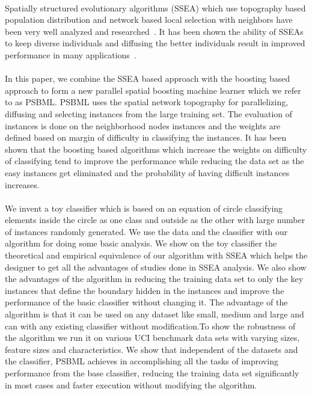 \documentclass{llncs}
\begin{document}
\paragraph{}
Spatially structured evolutionary algorithms (SSEA) which use topography based population distribution and network based local selection with neighbors have been very well analyzed and researched~\cite{Sarma96ananalysis}. It has been shown the ability of SSEAs to keep diverse individuals and diffusing the better individuals result in improved performance in many applications~\cite{tomassini2005spatially}.
\paragraph{}
In this paper, we combine the SSEA based approach with the boosting based approach to form a new parallel spatial boosting machine learner which we refer to as PSBML. PSBML uses the spatial network topography for parallelizing, diffusing and selecting instances from the large training set. The evaluation of instances is done on the neighborhood nodes instances and the weights are defined based on margin of difficulty in classifying the instances. It has been shown that the boosting based algorithms which increase the weights on difficulty of classifying tend to improve the performance while reducing the data set as the easy instances get eliminated and the probability of having difficult instances increases.
\paragraph{}
We invent a toy classifier which is based on an equation of circle classifying elements inside the circle as one class and outside as the other with large number of instances randomly generated. We use the data and the classifier with our algorithm for doing some basic analysis. We show on the toy classifier the theoretical and empirical equivalence of our algorithm with SSEA which helps the designer to get all the advantages of studies done in SSEA analysis. We also show the advantages of the algorithm in reducing the training data set to only the key instances that define the boundary hidden in the instances and improve the performance of the basic classifier without changing it. The advantage of the algorithm is that it can be used on any dataset like small, medium and large and can with any existing classifier without modification.To show the robustness of the algorithm we run it on various UCI benchmark data sets with varying sizes, feature sizes and characteristics. We show that independent of the datasets and the classifier, PSBML achieves in accomplishing all the tasks of improving performance from the base classifier, reducing the training data set significantly in most cases and faster execution without modifying the algorithm.
\end{document}
